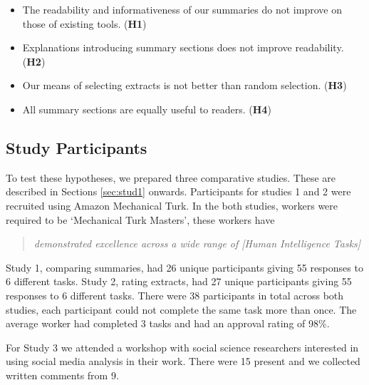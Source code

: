     \begin{itemize}
      \item{The readability and informativeness of our summaries do not improve on those of existing tools. (\textbf{H1})}
      \item{Explanations introducing summary sections does not improve readability. (\textbf{H2})}
      \item{Our means of selecting extracts is not better than random selection. (\textbf{H3})}
      \item{All summary sections are equally useful to readers. (\textbf{H4})}
    \end{itemize}

    \tocless\subsection{Study Participants}
      To test these hypotheses, we prepared three comparative studies. These are described in Sections \ref{sec:stud1} onwards. Participants for studies 1 and 2 were recruited using Amazon Mechanical Turk. In the both studies, workers were required to be `Mechanical Turk Masters', these workers have \blockquote{\textit{demonstrated excellence across a wide range of [Human Intelligence Tasks]}}. Study 1, comparing summaries, had 26 unique participants giving 55 responses to 6 different tasks. Study 2, rating extracts, had 27 unique participants giving 55 responses to 6 different tasks. There were 38 participants in total across both studies, each participant could not complete the same task more than once. The average worker had completed 3 tasks and had an approval rating of 98\%.

      For Study 3 we attended a workshop with social science researchers interested in using social media analysis in their work. There were 15 present and we collected written comments from 9.

